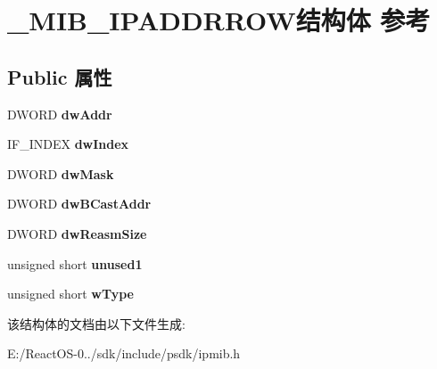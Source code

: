 \hypertarget{struct___m_i_b___i_p_a_d_d_r_r_o_w}{}\section{\+\_\+\+M\+I\+B\+\_\+\+I\+P\+A\+D\+D\+R\+R\+O\+W结构体 参考}
\label{struct___m_i_b___i_p_a_d_d_r_r_o_w}
\subsection*{Public 属性}
\begin{DoxyCompactItemize}
\item 
\mbox{\label{struct___m_i_b___i_p_a_d_d_r_r_o_w_a8698156681a6d0220e5cab14c988d581}} 
D\+W\+O\+RD {\bfseries dw\+Addr}
\item 
\mbox{\label{struct___m_i_b___i_p_a_d_d_r_r_o_w_aa4c8251f2672302150aab0d57ad9ed20}} 
I\+F\+\_\+\+I\+N\+D\+EX {\bfseries dw\+Index}
\item 
\mbox{\label{struct___m_i_b___i_p_a_d_d_r_r_o_w_a7a90fb8519245763d9e76897128b2d48}} 
D\+W\+O\+RD {\bfseries dw\+Mask}
\item 
\mbox{\label{struct___m_i_b___i_p_a_d_d_r_r_o_w_a661dadffbfdfc66c2416ff302ea6d274}} 
D\+W\+O\+RD {\bfseries dw\+B\+Cast\+Addr}
\item 
\mbox{\label{struct___m_i_b___i_p_a_d_d_r_r_o_w_a5dea3a8c213dde9147d3d0bdf70714ee}} 
D\+W\+O\+RD {\bfseries dw\+Reasm\+Size}
\item 
\mbox{\label{struct___m_i_b___i_p_a_d_d_r_r_o_w_a3af365f43eacf0990d21ce1440a75594}} 
unsigned short {\bfseries unused1}
\item 
\mbox{\label{struct___m_i_b___i_p_a_d_d_r_r_o_w_ae218ee58fae04101ed5ad3d3aab4d146}} 
unsigned short {\bfseries w\+Type}
\end{DoxyCompactItemize}


该结构体的文档由以下文件生成\+:\begin{DoxyCompactItemize}
\item 
E\+:/\+React\+O\+S-\/0../sdk/include/psdk/ipmib.\+h\end{DoxyCompactItemize}
